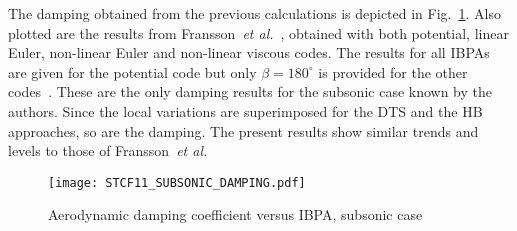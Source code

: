 The damping obtained from the previous calculations is depicted 
in Fig.~\ref{fig:stcf11_subsonic_damping}.  Also plotted are the results
from Fransson~\emph{et al.}~\cite{Fransson:1999uq}, obtained with both
potential, linear Euler, non-linear Euler and non-linear viscous codes.
The results for all IBPAs are given for the potential code but only $\beta=180^\circ$ is provided for the other codes~\cite{Fransson:1999uq}.
These are the only damping results for the
subsonic case known by the authors.  Since the local variations are
superimposed for the DTS and the HB approaches, so are the damping.
The present
results show similar trends and levels to those of Fransson~\emph{et al.} 
\begin{figure}[htb]
  \centering
  \texttt{[image: STCF11\_SUBSONIC\_DAMPING.pdf]}
  \caption{Aerodynamic damping coefficient versus IBPA, subsonic case}
  \label{fig:stcf11_subsonic_damping}
\end{figure}